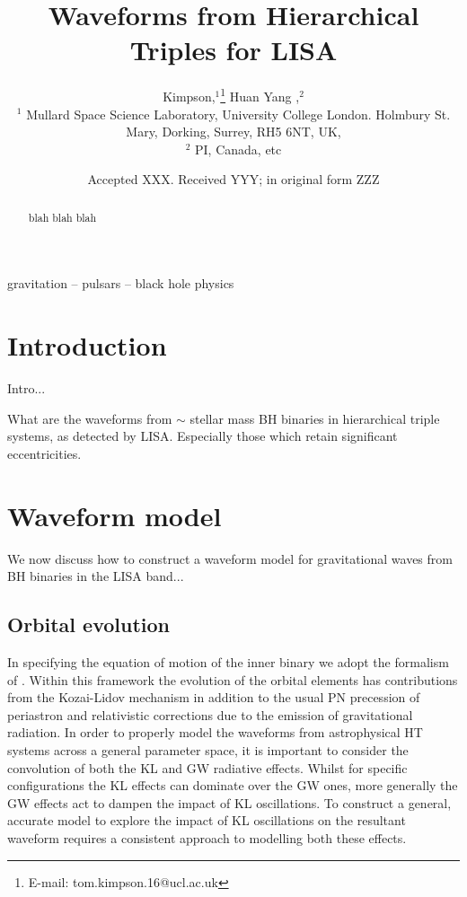 \documentclass[a4paper,fleqn,usenatbib]{mnras}
\title[Hierarchical Triples]{Waveforms from Hierarchical Triples for LISA}
\author[T. Kimpson et al.]{
 Kimpson,$^{1}$\thanks{E-mail: tom.kimpson.16@ucl.ac.uk}
Huan Yang  ,$^{2}$
\\
$^{1}$ Mullard Space Science Laboratory, University College London. Holmbury St. Mary, Dorking, Surrey, RH5 6NT, UK, \\
$^{2}$ PI, Canada, etc
}
\date{Accepted XXX. Received YYY; in original form ZZZ}
\begin{document}
\label{firstpage}
\pagerange{\pageref{firstpage}--\pageref{lastpage}}
\maketitle

\begin{abstract}
blah blah blah
\end{abstract}

\begin{keywords}
gravitation -- pulsars -- black hole physics
\end{keywords}



\section{Introduction}
Intro...

\noindent What are the waveforms from $\sim$ stellar mass BH binaries in hierarchical triple systems, as detected by LISA. Especially those which retain significant eccentricities.

\section{Waveform model}
We now discuss how to construct a waveform model for gravitational waves from BH binaries in the LISA band...



\subsection{Orbital evolution}

In specifying the equation of motion of the inner binary we adopt the formalism of \citep{Randall2018}. Within this framework the evolution of the orbital elements has contributions from the Kozai-Lidov mechanism in addition to the usual PN precession of periastron and relativistic corrections due to the emission of gravitational radiation. In order to properly model the waveforms from astrophysical HT systems across a general parameter space, it is important to consider the convolution of both the KL and GW radiative effects. Whilst for specific configurations the KL effects can dominate over the GW ones, more generally the GW effects act to dampen the impact of KL oscillations. To construct a general, accurate model to explore the impact of KL oscillations on the resultant waveform requires a consistent approach to modelling both these effects. \newline 
\end{document}
